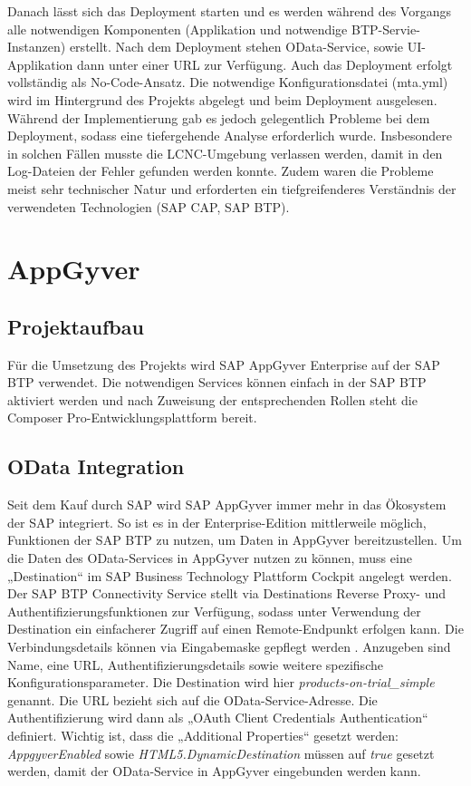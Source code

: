 Danach lässt sich das Deployment starten und es werden während des Vorgangs alle notwendigen Komponenten (Applikation und notwendige BTP-Servie-Instanzen) erstellt. Nach dem Deployment stehen OData-Service, sowie UI-Applikation dann unter einer URL zur Verfügung.
Auch das Deployment erfolgt vollständig als No-Code-Ansatz. Die notwendige Konfigurationsdatei (mta.yml) wird im Hintergrund des Projekts abgelegt und beim Deployment ausgelesen. Während der Implementierung gab es jedoch gelegentlich Probleme bei dem Deployment, sodass eine tiefergehende Analyse erforderlich wurde. Insbesondere in solchen Fällen musste die LCNC-Umgebung verlassen werden, damit in den Log-Dateien der Fehler gefunden werden konnte. Zudem waren die Probleme meist sehr technischer Natur und erforderten ein tiefgreifenderes Verständnis der verwendeten Technologien (SAP CAP, SAP BTP).

\section{AppGyver}
\subsection{Projektaufbau}

Für die Umsetzung des Projekts wird SAP AppGyver Enterprise auf der SAP BTP verwendet. Die notwendigen Services können einfach in der SAP BTP aktiviert werden und nach Zuweisung der entsprechenden Rollen steht die Composer Pro-Entwicklungsplattform bereit.

\subsection{OData Integration}

Seit dem Kauf durch SAP wird SAP AppGyver immer mehr in das Ökosystem der SAP integriert. So ist es in der Enterprise-Edition mittlerweile möglich, Funktionen der SAP BTP zu nutzen, um Daten in AppGyver bereitzustellen. Um die Daten des OData-Services in AppGyver nutzen zu können, muss eine „Destination“ im SAP Business Technology Plattform Cockpit angelegt werden. Der SAP BTP Connectivity Service stellt via Destinations Reverse Proxy- und Authentifizierungsfunktionen zur Verfügung, sodass unter Verwendung der Destination ein einfacherer Zugriff auf einen Remote-Endpunkt erfolgen kann. Die Verbindungsdetails können via Eingabemaske gepflegt werden \cite{shp:dest}. Anzugeben sind Name, eine URL, Authentifizierungsdetails sowie weitere spezifische Konfigurationsparameter. Die Destination wird hier \textit{products-on-trial\_simple} genannt. Die URL bezieht sich auf die OData-Service-Adresse. Die Authentifizierung wird dann als „OAuth Client Credentials Authentication“ definiert. Wichtig ist, dass die „Additional Properties“ gesetzt werden: \textit{AppgyverEnabled} sowie \textit{HTML5.DynamicDestination} müssen auf \textit{true} gesetzt werden, damit der OData-Service in AppGyver eingebunden werden kann.

